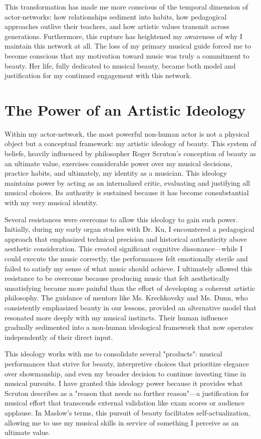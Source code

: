 \documentclass{article} %
\begin{document}
This transformation has made me more conscious of the temporal dimension of actor-networks: how relationships sediment into habits, how pedagogical approaches outlive their teachers, and how artistic values transmit across generations.
Furthermore, this rupture has heightened my awareness of why I maintain this network at all. 
The loss of my primary musical guide forced me to become conscious that my motivation toward music was truly a commitment to beauty. 
Her life, fully dedicated to musical beauty, became both model and justification for my continued engagement with this network.

\section{The Power of an Artistic Ideology}

Within my actor-network, the most powerful non-human actor is not a physical object but a conceptual framework: my artistic ideology of beauty. 
This system of beliefs, heavily influenced by philosopher Roger Scruton's conception of beauty as an ultimate value, exercises considerable power over my musical decisions, practice habits, and ultimately, my identity as a musician.
This ideology maintains power by acting as an internalized critic, evaluating and justifying all musical choices. 
Its authority is sustained because it has become consubstantial with my very musical identity.

Several resistances were overcome to allow this ideology to gain such power. Initially, during my early organ studies with Dr. Ku, I encountered a pedagogical approach that emphasized technical precision and historical authenticity above aesthetic consideration. 
This created significant cognitive dissonance—while I could execute the music correctly, the performances felt emotionally sterile and failed to satisfy my sense of what music should achieve.
I ultimately allowed this resistance to be overcome because producing music that felt aesthetically unsatisfying became more painful than the effort of developing a coherent artistic philosophy. 
The guidance of mentors like Ms. Krechkovsky and Ms. Dunn, who consistently emphasized beauty in our lessons, provided an alternative model that resonated more deeply with my musical instincts. 
Their human influence gradually sedimented into a non-human ideological framework that now operates independently of their direct input.

This ideology works with me to consolidate several "products": musical performances that strive for beauty, interpretive choices that prioritize elegance over showmanship, and even my broader decision to continue investing time in musical pursuits.
I have granted this ideology power because it provides what Scruton describes as a "reason that needs no further reason"—a justification for musical effort that transcends external validation like exam scores or audience applause. In Maslow's terms, this pursuit of beauty facilitates self-actualization, allowing me to use my musical skills in service of something I perceive as an ultimate value.
\end{document}
